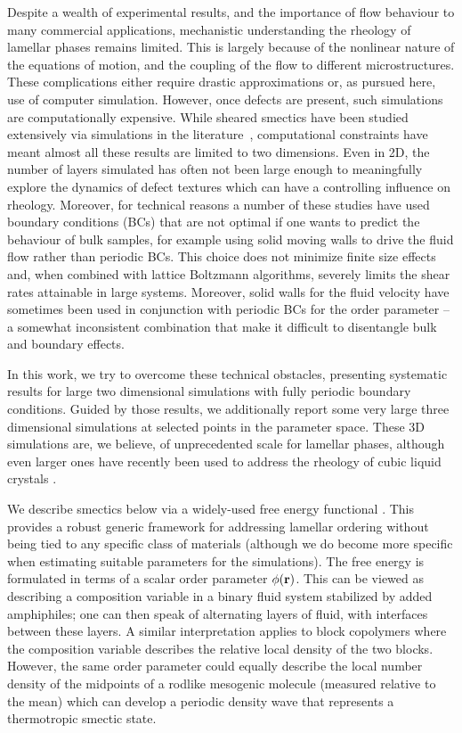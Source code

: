 \documentclass[8.5pt,twoside,twocolumn]{article}
\begin{document}
Despite a wealth of experimental results, and the importance of flow behaviour
to many commercial applications, mechanistic understanding
the rheology of lamellar phases remains limited. This is largely
because of the nonlinear nature of the equations of motion, and the
coupling of the flow to different microstructures. These complications either require
drastic approximations or, as pursued here, use of computer
simulation. However, once defects are present, such simulations are computationally expensive. 
While sheared smectics have been studied extensively via simulations
in the literature~\cite{Swift96,Gonnella97,Gonnella98,Xu03,Xu05,Xu06a,Xu06b},
computational constraints have meant almost all these results are limited
to two dimensions. Even in 2D, the number of layers simulated has often not been large enough to meaningfully explore the dynamics of defect textures which can have a controlling influence on rheology. Moreover, for technical reasons a number of these studies have used boundary conditions (BCs) that are not optimal if one wants to predict the behaviour of bulk samples, for example using solid moving walls to drive the fluid flow rather than periodic BCs. This choice does not minimize finite size effects and, when combined with lattice Boltzmann algorithms, severely limits the shear rates attainable in large systems. Moreover, solid walls for the fluid velocity have sometimes been used in conjunction with periodic BCs for the order parameter \cite{Xu06b} -- a somewhat inconsistent combination that make it difficult to disentangle bulk and boundary effects. 

In this work, we try to overcome these technical obstacles, presenting systematic results for large two dimensional simulations with fully periodic boundary conditions.
Guided by those results, we additionally report some very large three dimensional simulations at selected points in the parameter space. These 3D simulations are, we believe, of unprecedented scale for lamellar phases, although even larger ones have recently been used to address the rheology of cubic liquid crystals \cite{Saksena09a, Saksena09b}.

We describe smectics below via a widely-used free energy functional \cite{Gompper, Gonnella97, Xu06b, Cencini07}. This provides a robust generic framework for addressing lamellar ordering without being tied to any specific class of materials (although we do become more specific when estimating suitable parameters for the simulations). The free energy is formulated in terms of a scalar order parameter $\phi({\bf r})$. This can be viewed as describing a composition variable in a binary fluid system stabilized by added amphiphiles; one can then speak of alternating layers of fluid, with interfaces between these layers. A similar interpretation applies to block copolymers where the composition variable describes the relative local density of the two blocks. However, the same order parameter could equally describe the local number density of the midpoints of a rodlike mesogenic molecule (measured relative to the mean) which can develop a periodic density wave that represents a thermotropic smectic state.
\end{document}
